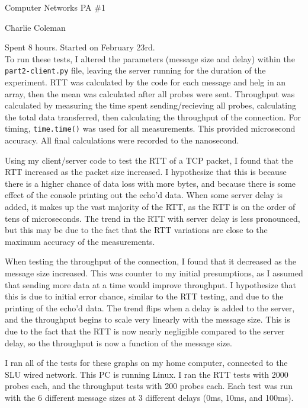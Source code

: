 \documentclass[12pt]{article}
\begin{document}
	\onehalfspace
	\begin{center}
		\begin{large} Computer Networks PA \#1 \end{large}
	\end{center}
	
	\hfill Charlie Coleman
		
	\hfill Spent 8 hours. Started on February 23rd.\\
	
	To run these tests, I altered the parameters (message size and delay) within the \texttt{part2-client.py} file, leaving the server running for the duration of the experiment. RTT was calculated by the code for each message and helg in an array, then the mean was calculated after all probes were sent. Throughput was calculated by measuring the time spent sending/recieving all probes, calculating the total data transferred, then calculating the throughput of the connection. For timing, \texttt{time.time()} was used for all measurements. This provided microsecond accuracy. All final calculations were recorded to the nanosecond.
	
	Using my client/server code to test the RTT of a TCP packet, I found that the RTT increased as the packet size increased. I hypothesize that this is because there is a higher chance of data loss with more bytes, and because there is some effect of the console printing out the echo'd data. When some server delay is added, it makes up the vast majority of the RTT, as the RTT is on the order of tens of microseconds. The trend in the RTT with server delay is less pronounced, but this may be due to the fact that the RTT variations are close to the maximum accuracy of the measurements.
	
	When testing the throughput of the connection, I found that it decreased as the message size increased. This was counter to my initial presumptions, as I assumed that sending more data at a time would improve throughput. I hypothesize that this is due to initial error chance, similar to the RTT testing, and due to the printing of the echo'd data. The trend flips when a delay is added to the server, and the throughput begins to scale very linearly with the message size. This is due to the fact that the RTT is now nearly negligible compared to the server delay, so the throughput is now a function of the message size.
	
	I ran all of the tests for these graphs on my home computer, connected to the SLU wired network. This PC is running  Linux. I ran the RTT tests with 2000 probes each, and the throughput tests with 200 probes each. Each test was run with the 6 different message sizes at 3 different delays (0ms, 10ms, and 100ms). 
	
\end{document}
